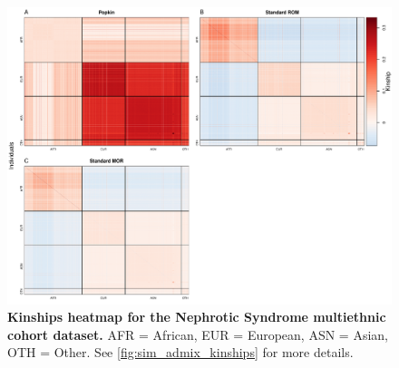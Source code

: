 \documentclass[11pt]{article}
\begin{document}
\begin{figure}[bp!]
  \centering
  \includegraphics[width=\textwidth]{data/SFig_NS_sex_array_kinships.pdf}
  \caption{
    {\bf Kinships heatmap for the Nephrotic Syndrome multiethnic cohort dataset.} AFR = African, EUR = European, ASN = Asian, OTH = Other.
    See \cref{fig:sim_admix_kinships} for more details.
    }
  \label{fig:NS_kinships}
\end{figure}
\end{document}

